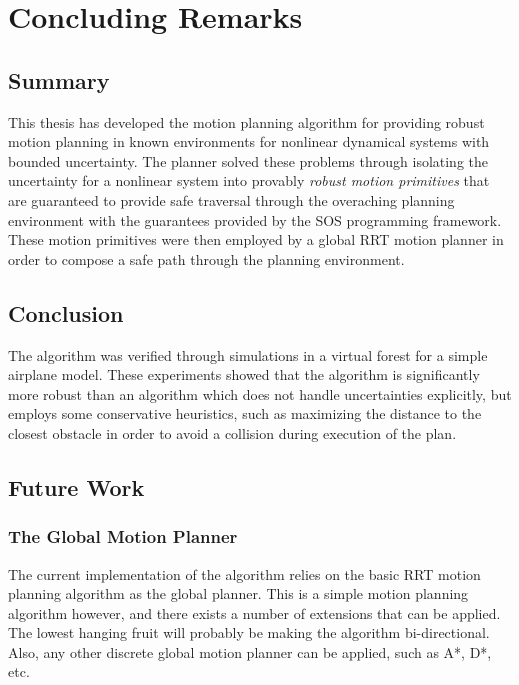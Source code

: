 \chapter{Concluding Remarks}
\label{chp:concluding-remarks}

\section{Summary}

This thesis has developed the \rrtfunnel{} motion planning algorithm for
providing robust motion planning in known environments for nonlinear dynamical
systems with bounded uncertainty. The planner solved these problems through
isolating the uncertainty for a nonlinear system into provably \textit{robust
  motion primitives} that are guaranteed to provide safe traversal through the
overaching planning environment with the guarantees provided by the \ac{SOS}
programming framework. These motion primitives were then employed by a global
\ac{RRT} motion planner in order to compose a safe path through the planning
environment.

\section{Conclusion}

The algorithm was verified through simulations in a virtual forest for a simple
airplane model. These experiments showed that the \rrtfunnel{} algorithm is
significantly more robust than an algorithm which does not handle uncertainties
explicitly, but employs some conservative heuristics, such as maximizing the
distance to the closest obstacle in order to avoid a collision during execution
of the plan.


\section{Future Work}

\subsection{The Global Motion Planner}

The current implementation of the \rrtfunnel{} algorithm relies on the basic
\ac{RRT} motion planning algorithm as the global planner. This is a simple
motion planning algorithm however, and there exists a number of extensions that
can be applied. The lowest hanging fruit will probably be making the algorithm
bi-directional. Also, any other discrete global motion planner can be applied,
such as A*, D*, etc.

